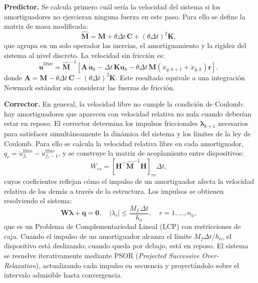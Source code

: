 \documentclass[preprint,12pt,authoryear]{elsarticle}
\newcommand{\Mf}{M_{\!f}}
\newcommand{\ha}{h_a}
\begin{document}
\textbf{Predictor.}
Se calcula primero cuál sería la velocidad del sistema si los amortiguadores
no ejercieran ninguna fuerza en este paso. Para ello se define la matriz de
masa modificada:
\begin{equation}
    \hat{\bm{M}} = \bm{M}
                  + \theta\Delta t\,\bm{C}
                  + (\theta\Delta t)^{2}\bm{K},
    \label{eq:Mhat}
\end{equation}
que agrupa en un solo operador las inercias, el amortiguamiento y la rigidez
del sistema al nivel discreto. La velocidad sin fricción es:
\begin{equation}
    \dot{\bm{u}}^{\mathrm{libre}} = \hat{\bm{M}}^{-1}
    \!\left[
        \bm{A}\,\dot{\bm{u}}_k
        - \Delta t\,\bm{K}\bm{u}_k
        - \theta\Delta t\,\bm{M}\!\left(\ddot{x}_{g,k+1}+\ddot{x}_{g,k}\right)\bm{r}
    \right],
    \label{eq:vfree}
\end{equation}
donde $\bm{A} = \bm{M} - \theta\Delta t\,\bm{C} - (\theta\Delta t)^{2}\bm{K}$.
Este resultado equivale a una integración Newmark estándar sin considerar las
fuerzas de fricción.

\textbf{Corrector.}
En general, la velocidad libre no cumple la condición de Coulomb: hay
amortiguadores que aparecen con velocidad relativa no nula cuando deberían
estar en reposo. El corrector determina los impulsos friccionales
$\bm{\lambda}_{k+1}$ necesarios para satisfacer simultáneamente la dinámica
del sistema y los límites de la ley de Coulomb. Para ello se calcula la
velocidad relativa libre en cada amortiguador,
$q_r = \dot{u}^{\mathrm{libre}}_{f_r} - \dot{u}^{\mathrm{libre}}_{f_r-1}$,
y se construye la matriz de acoplamiento entre dispositivos:
\begin{equation}
    W_{rs} = \left[\bm{H}^{\top}\hat{\bm{M}}^{-1}\bm{H}\right]_{rs}\Delta t,
    \label{eq:W}
\end{equation}
cuyos coeficientes reflejan cómo el impulso de un amortiguador afecta la
velocidad relativa de los demás a través de la estructura. Los impulsos se
obtienen resolviendo el sistema:
\begin{equation}
    \bm{W}\bm{\lambda} + \bm{q} = \bm{0},
    \quad |\lambda_r| \leq \frac{\Mf\,\Delta t}{\ha},
    \quad r = 1,\ldots,n_a,
    \label{eq:lcp}
\end{equation}
que es un Problema de Complementariedad Lineal (LCP) con restricciones de caja.
Cuando el impulso de un amortiguador alcanza el límite $\Mf\Delta t/\ha$, el
dispositivo está deslizando; cuando queda por debajo, está en reposo. El sistema
se resuelve iterativamente mediante PSOR (\textit{Projected Successive Over-Relaxation}), actualizando cada impulso en secuencia
y proyectándolo sobre el intervalo admisible hasta convergencia.
\end{document}
